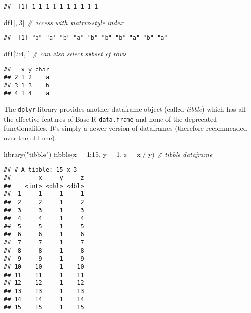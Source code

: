 \documentclass[
  oneside]{book}
\newenvironment{Shaded}{\begin{snugshade}}{\end{snugshade}}
\newcommand{\AttributeTok}[1]{\textcolor[rgb]{0.77,0.63,0.00}{#1}}
\newcommand{\CommentTok}[1]{\textcolor[rgb]{0.56,0.35,0.01}{\textit{#1}}}
\newcommand{\DecValTok}[1]{\textcolor[rgb]{0.00,0.00,0.81}{#1}}
\newcommand{\FunctionTok}[1]{\textcolor[rgb]{0.00,0.00,0.00}{#1}}
\newcommand{\NormalTok}[1]{#1}
\newcommand{\SpecialCharTok}[1]{\textcolor[rgb]{0.00,0.00,0.00}{#1}}
\newcommand{\StringTok}[1]{\textcolor[rgb]{0.31,0.60,0.02}{#1}}
\begin{document}
\begin{verbatim}
##  [1] 1 1 1 1 1 1 1 1 1 1
\end{verbatim}

\begin{Shaded}
\begin{Highlighting}[]
\NormalTok{df1[, }\DecValTok{3}\NormalTok{] }\CommentTok{\# access with matrix{-}style index}
\end{Highlighting}
\end{Shaded}

\begin{verbatim}
##  [1] "b" "a" "b" "a" "b" "b" "b" "a" "b" "a"
\end{verbatim}

\begin{Shaded}
\begin{Highlighting}[]
\NormalTok{df1[}\DecValTok{2}\SpecialCharTok{:}\DecValTok{4}\NormalTok{, ] }\CommentTok{\# can also select subset of rows}
\end{Highlighting}
\end{Shaded}

\begin{verbatim}
##   x y char
## 2 1 2    a
## 3 1 3    b
## 4 1 4    a
\end{verbatim}

The \texttt{dplyr} library provides another dataframe object (called \emph{tibble}) which has all
the effective features of Base R \texttt{data.frame} and none of the
deprecated functionalities. It's simply a newer version of dataframes (therefore
recommended over the old one).

\begin{Shaded}
\begin{Highlighting}[]
\FunctionTok{library}\NormalTok{(}\StringTok{"tibble"}\NormalTok{)}
\FunctionTok{tibble}\NormalTok{(}\AttributeTok{x =} \DecValTok{1}\SpecialCharTok{:}\DecValTok{15}\NormalTok{, }\AttributeTok{y =} \DecValTok{1}\NormalTok{, }\AttributeTok{z =}\NormalTok{ x }\SpecialCharTok{/}\NormalTok{ y) }\CommentTok{\# tibble dataframe}
\end{Highlighting}
\end{Shaded}

\begin{verbatim}
## # A tibble: 15 x 3
##        x     y     z
##    <int> <dbl> <dbl>
##  1     1     1     1
##  2     2     1     2
##  3     3     1     3
##  4     4     1     4
##  5     5     1     5
##  6     6     1     6
##  7     7     1     7
##  8     8     1     8
##  9     9     1     9
## 10    10     1    10
## 11    11     1    11
## 12    12     1    12
## 13    13     1    13
## 14    14     1    14
## 15    15     1    15
\end{verbatim}
\end{document}
